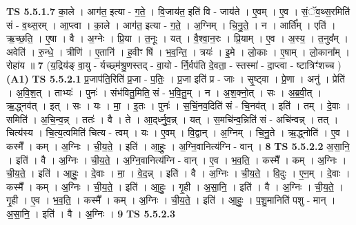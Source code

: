 \documentclass[17pt]{extarticle}
\begin{document}
                  \newline
                                \textbf{ TS 5.5.1.7} \newline
                  का॒ले । आग॑त॒ इत्या - ग॒ते॒ । वि॒जाय॑त॒ इति॑ वि - जाय॑ते । ए॒वम् । ए॒व । सं॒ॅव॒थ्स॒रमिति॑ सं - व॒थ्स॒रम् । आ॒प्त्वा । का॒ले । आग॑त॒ इत्या - ग॒ते॒ । अ॒ग्निम् । चि॒नु॒ते॒ । न । आर्ति᳚म् । एति॑ । ऋ॒च्छ॒ति॒ । ए॒षा । वै । अ॒ग्नेः । प्रि॒या । त॒नूः । यत् । वै॒श्वा॒न॒रः । प्रि॒याम् । ए॒व । अ॒स्य॒ । त॒नुव᳚म् । अवेति॑ । रु॒न्धे॒ । त्रीणि॑ । ए॒तानि॑ । ह॒वीꣳ षि॑ । भ॒व॒न्ति॒ । त्रयः॑ । इ॒मे । लो॒काः । ए॒षाम् । लो॒काना᳚म् । रोहा॑य ॥ \textbf{  7 } \newline
                  \newline
                      (य॒द्रिय॑ङ् वा॒यु - र्यच्छ्म॑श्रु॒णस्तद् - वा॒यो - र्नि॒र्वप॑ति दे॒वता॒ - स्तस्मा॑ - दा॒प्त्वा - ष्टात्रिꣳ॑शच्च )  \textbf{(A1)} \newline \newline
                                \textbf{ TS 5.5.2.1} \newline
                  प्र॒जाप॑ति॒रिति॑ प्र॒जा - प॒तिः॒ । प्र॒जा इति॑ प्र - जाः । सृ॒ष्ट्वा । प्रे॒णा । अनु॑ । प्रेति॑ । अ॒वि॒श॒त् । ताभ्यः॑ । पुनः॑ । संभ॑वितु॒मिति॒ सं - भ॒वि॒तु॒म् । न । अ॒श॒क्नो॒त् । सः । अ॒ब्र॒वी॒त् । ऋ॒द्ध्नव॑त् । इत् । सः । यः । मा॒ । इ॒तः । पुनः॑ । स॒चिं॒नव॒दिति॑ सं - चि॒नव॑त् । इति॑ । तम् । दे॒वाः । समिति॑ । अ॒चि॒न्व॒न्न् । ततः॑ । वै । ते । आ॒द्‌र्ध्नु॒व॒न्न् । यत् । स॒मचि॑न्व॒न्निति॑ सं - अचि॑न्वन्न् । तत् । चित्य॑स्य । चि॒त्य॒त्वमिति॑ चित्य - त्वम् । यः । ए॒वम् । वि॒द्वान् । अ॒ग्निम् । चि॒नु॒ते । ऋ॒द्ध्नोति॑ । ए॒व । कस्मै᳚ । कम् । अ॒ग्निः । ची॒य॒ते॒ । इति॑ । आ॒हुः॒ । अ॒ग्नि॒वानित्य॑ग्नि - वान् । \textbf{  8} \newline
                  \newline
                                \textbf{ TS 5.5.2.2} \newline
                  अ॒सा॒नि॒ । इति॑ । वै । अ॒ग्निः । ची॒य॒ते॒ । अ॒ग्नि॒वानित्य॑ग्नि - वान् । ए॒व । भ॒व॒ति॒ । कस्मै᳚ । कम् । अ॒ग्निः । ची॒य॒ते॒ । इति॑ । आ॒हुः॒ । दे॒वाः । मा॒ । वे॒द॒न्न् । इति॑ । वै । अ॒ग्निः । ची॒य॒ते॒ । वि॒दुः । ए॒न॒म् । दे॒वाः । कस्मै᳚ । कम् । अ॒ग्निः । ची॒य॒ते॒ । इति॑ । आ॒हुः॒ । गृ॒ही । अ॒सा॒नि॒ । इति॑ । वै । अ॒ग्निः । ची॒य॒ते॒ । गृ॒ही । ए॒व । भ॒व॒ति॒ । कस्मै᳚ । कम् । अ॒ग्निः । ची॒य॒ते॒ । इति॑ । आ॒हुः॒ । प॒शु॒मानिति॑ पशु - मान् । अ॒सा॒नि॒ । इति॑ । वै । अ॒ग्निः । \textbf{  9} \newline
                  \newline
                                \textbf{ TS 5.5.2.3} \newline
\end{document}
